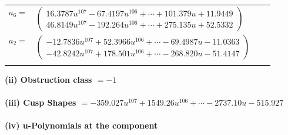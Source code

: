 \documentclass[1p]{elsarticle_modified}
\theoremstyle{definition}
\begin{document}
\begin{tabular}{m{7pt} m{180pt} m{7pt} m{180pt} }
\flushright $a_{6}=$&$\begin{pmatrix}16.3787 u^{107}-67.4197 u^{106}+\cdots+101.379 u+11.9449\\46.8149 u^{107}-192.264 u^{106}+\cdots+275.135 u+52.5332\end{pmatrix}$ \\
\flushright $a_{2}=$&$\begin{pmatrix}-12.7836 u^{107}+52.3966 u^{106}+\cdots-69.4987 u-11.0363\\-42.8242 u^{107}+178.501 u^{106}+\cdots-268.820 u-51.4147\end{pmatrix}$\\&\end{tabular}
\flushleft \textbf{(ii) Obstruction class $= -1$}\\~\\
\flushleft \textbf{(iii) Cusp Shapes $= -359.027 u^{107}+1549.26 u^{106}+\cdots-2737.10 u-515.927$}\\~\\
\newpage\renewcommand{\arraystretch}{1}
\flushleft \textbf{(iv) u-Polynomials at the component}\newline \\
\end{document}
